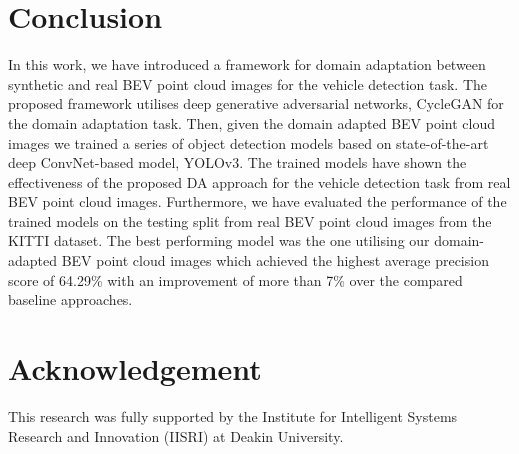 \documentclass[letterpaper, 10 pt, conference]{IEEEtran}
\begin{document}
\section{Conclusion}\label{concl}
In this work, we have introduced a framework for domain adaptation between synthetic and real BEV point cloud images for the vehicle detection task. The proposed framework utilises deep generative adversarial networks, CycleGAN for the domain adaptation task. Then, given the domain adapted BEV point cloud images we trained a series of object detection models based on state-of-the-art deep ConvNet-based model, YOLOv3. The trained models have shown the effectiveness of the proposed DA approach for the vehicle detection task from real BEV point cloud images. Furthermore, we have evaluated the performance of the trained models on the testing split from real BEV point cloud images from the KITTI dataset. The best performing model was the one utilising our domain-adapted BEV point cloud images which achieved the highest average precision score of 64.29\% with an improvement of more than 7\% over the compared baseline approaches.


	
	
	
\section*{Acknowledgement}
This research was fully supported by the Institute for Intelligent Systems Research and Innovation (IISRI) at Deakin University.
	
	
	
	
	
	
	
	
	
\end{document}
